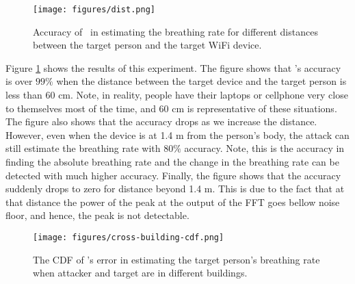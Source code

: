 \begin{figure}
    \centering
    \texttt{[image: figures/dist.png]}
    \caption{Accuracy of \wisneak\ in estimating the breathing rate for different distances between the target person and the target WiFi device.}
    \label{fig:dist}
\end{figure}

Figure \ref{fig:dist} shows the results of this experiment.  The figure shows that \wisneak's accuracy is over $99\%$ when the distance between the target device and the target person is less than $60$ cm. Note, in reality, people have their laptops or cellphone very close to themselves most of the time, and $60$ cm is representative of these situations. The figure also shows that the accuracy drops as we increase the distance. However, even when the device is at 1.4 m from the person's body, the attack can still estimate the breathing rate with $80\%$ accuracy. Note, this is the accuracy in finding the absolute breathing rate and the change in the breathing rate can be detected with much higher accuracy. Finally, the figure shows that the accuracy suddenly drops to zero for distance beyond 1.4 m. This is due to the fact that at that distance the power of the peak at the output of the FFT goes bellow noise floor, and hence, the peak is not detectable.

\begin{figure}
    \centering
    \texttt{[image: figures/cross-building-cdf.png]}
    \caption{The CDF of \wisneak's error in estimating the target person's breathing rate when attacker and target are in different buildings.}
    \label{fig:cross-building}
\end{figure}

